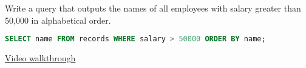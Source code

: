 \question Write a query that outputs the names of all employees with salary
greater than 50,000 in alphabetical order.

\begin{solution}[1cm]
\begin{lstlisting}[language=SQL]
SELECT name FROM records WHERE salary > 50000 ORDER BY name;
\end{lstlisting}
\href{https://youtu.be/GBqEWJKGL2k?t=1m36s}{Video walkthrough}
\end{solution}
